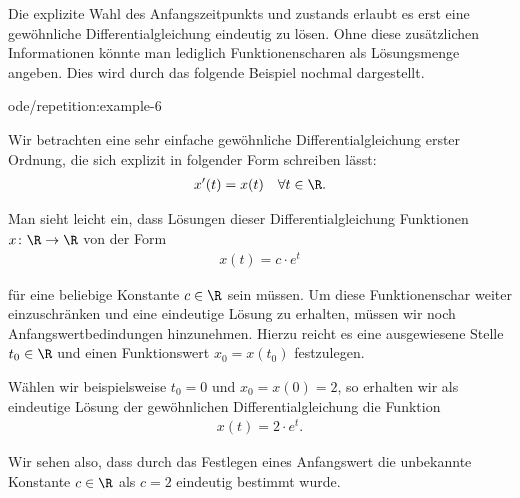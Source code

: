 \documentclass[letterpaper,10pt,german]{jupyterBook}
\begin{document}
\par
Die explizite Wahl des Anfangszeitpunkts und  zustands erlaubt es erst eine gewöhnliche Differentialgleichung eindeutig zu lösen.
Ohne diese zusätzlichen Informationen könnte man lediglich Funktionenscharen als Lösungsmenge angeben.
Dies wird durch das folgende Beispiel nochmal dargestellt.
\begin{example}{}{ode/repetition:example-6}



\par
Wir betrachten eine sehr einfache gewöhnliche Differentialgleichung erster Ordnung, die sich explizit in folgender Form schreiben lässt:
\begin{align*}
x'(t) = x(t) \quad \forall t \in \R.
\end{align*}
\par
Man sieht leicht ein, dass Lösungen dieser Differentialgleichung Funktionen \(x \colon \R \rightarrow \R\) von der Form
\begin{align*}
x(t) = c\cdot e^t
\end{align*}
\par
für eine beliebige Konstante \(c \in \R\) sein müssen.
Um diese Funktionenschar weiter einzuschränken und eine eindeutige Lösung zu erhalten, müssen wir noch Anfangswertbedindungen hinzunehmen.
Hierzu reicht es eine ausgewiesene Stelle \(t_0 \in \R\) und einen Funktionswert \(x_0 = x(t_0)\) festzulegen.

\par
Wählen wir beispielsweise \(t_0 = 0\) und \(x_0 = x(0) = 2\), so erhalten wir als eindeutige Lösung der gewöhnlichen Differentialgleichung die Funktion
\begin{align*}
x(t) = 2\cdot e^t.
\end{align*}
\par
Wir sehen also, dass durch das Festlegen eines Anfangswert die unbekannte Konstante \(c \in \R\) als \(c=2\) eindeutig bestimmt wurde.
\end{example}
\end{document}
